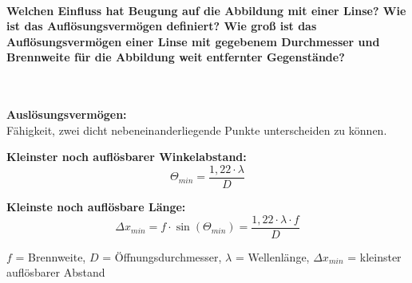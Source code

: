 \documentclass[a4paper, 11pt, ngerman, parskip=half-]{scrartcl}
\begin{document}
\paragraph{Welchen Einfluss hat Beugung auf die Abbildung mit einer Linse? Wie ist das
    Auflösungsvermögen definiert? Wie groß ist das Auflösungsvermögen einer Linse mit gegebenem
    Durchmesser und Brennweite für die Abbildung weit entfernter Gegenstände?} ~

\textbf{Auslösungsvermögen:}\\
Fähigkeit, zwei dicht nebeneinanderliegende Punkte unterscheiden zu können.

\textbf{Kleinster noch auflösbarer Winkelabstand:}
\begin{equation}
    \Theta_{min} = \frac{1,22 \cdot \lambda}{D}
\end{equation}

\textbf{Kleinste noch auflösbare Länge:}
\begin{equation}
    \Delta x_{min} = f \cdot \sin(\Theta_{min}) = \frac{1,22 \cdot \lambda \cdot f}{D}
\end{equation}

$f$ = Brennweite, $D$ = Öffnungsdurchmesser, $\lambda$ = Wellenlänge, $\Delta x_{min}$ = kleinster auflösbarer Abstand
\end{document}

